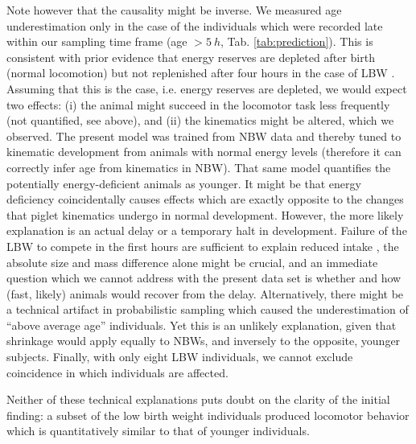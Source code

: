 Note however that the causality might be inverse.
We measured age underestimation only in the case of the individuals which were recorded late within our sampling time frame (age \(> 5\ h\), Tab. \ref{tab:prediction}).
This is consistent with prior evidence that energy reserves are depleted after birth (normal locomotion) but not replenished after four hours in the case of LBW \citep{LeDividich2017,VandenHole2019}.
Assuming that this is the case, i.e. energy reserves are depleted, we would expect two effects: (i) the animal might succeed in the locomotor task less frequently (not quantified, see above), and (ii) the kinematics might be altered, which we observed.
The present model was trained from NBW data and thereby tuned to kinematic development from animals with normal energy levels (therefore it can correctly infer age from kinematics in NBW).
That same model quantifies the potentially energy-deficient animals as younger.
It might be that energy deficiency coincidentally causes effects which are exactly opposite to the changes that piglet kinematics undergo in normal development.
However, the more likely explanation is an actual delay or a temporary halt in development.
Failure of the LBW to compete in the first hours are sufficient to explain reduced intake \citep{Amdi2013}, the absolute size and mass difference alone might be crucial, and an immediate question which we cannot address with the present data set is whether and how (fast, likely) animals would recover from the delay.
Alternatively, there might be a technical artifact in probabilistic sampling \citep["shrinkage", \textit{cf.}][]{Gelman2013} which caused the underestimation of ``above average age'' individuals.
Yet this is an unlikely explanation, given that shrinkage would apply equally to NBWs, and inversely to the opposite, younger subjects.
Finally, with only eight LBW individuals, we cannot exclude coincidence in which individuals are affected.

Neither of these technical explanations puts doubt on the clarity of the initial finding: a subset of the low birth weight individuals produced locomotor behavior which is quantitatively similar to that of younger individuals.


